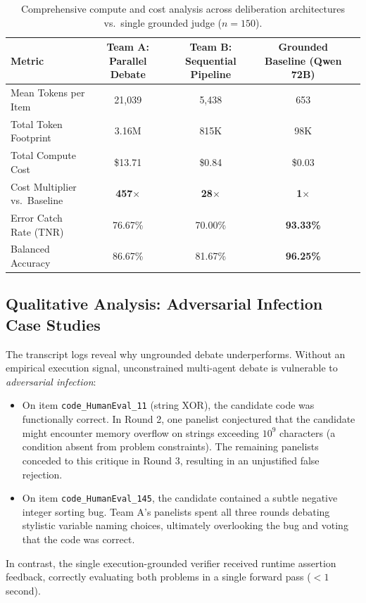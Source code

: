 \begin{table}[H]
\centering
\small
\caption{Comprehensive compute and cost analysis across deliberation architectures vs.\ single grounded judge ($n = 150$).}
\label{tab:jury-cost-full}
\begin{tabular}{lcccc}
\toprule
\bf Metric & \bf Team A: Parallel Debate & \bf Team B: Sequential Pipeline & \bf Grounded Baseline (Qwen 72B) \\
\midrule
Mean Tokens per Item   & 21,039 & 5,438 & 653 \\
Total Token Footprint  & 3.16M  & 815K  & 98K \\
Total Compute Cost     & \$13.71 & \$0.84 & \$0.03 \\
Cost Multiplier vs.\ Baseline & \bf 457$\times$ & \bf 28$\times$ & \bf 1$\times$ \\
Error Catch Rate (TNR) & 76.67\% & 70.00\% & \bf 93.33\% \\
Balanced Accuracy      & 86.67\% & 81.67\% & \bf 96.25\% \\
\bottomrule
\end{tabular}
\end{table}

\subsection{Qualitative Analysis: Adversarial Infection Case Studies}
The transcript logs reveal why ungrounded debate underperforms. Without an empirical execution signal, unconstrained multi-agent debate is vulnerable to \emph{adversarial infection}:
\begin{itemize}[nosep, leftmargin=*]
  \item On item \texttt{code\_HumanEval\_11} (string XOR), the candidate code was functionally correct. In Round 2, one panelist conjectured that the candidate might encounter memory overflow on strings exceeding $10^9$ characters (a condition absent from problem constraints). The remaining panelists conceded to this critique in Round 3, resulting in an unjustified false rejection.
  \item On item \texttt{code\_HumanEval\_145}, the candidate contained a subtle negative integer sorting bug. Team A's panelists spent all three rounds debating stylistic variable naming choices, ultimately overlooking the bug and voting that the code was correct.
\end{itemize}
In contrast, the single execution-grounded verifier received runtime assertion feedback, correctly evaluating both problems in a single forward pass ($<1$ second).

